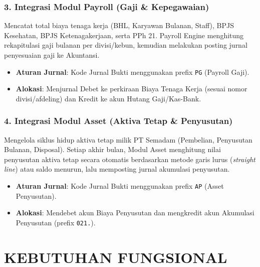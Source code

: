 \documentclass[11pt,a4paper]{article}
\begin{document}
\subsubsection{3. Integrasi Modul Payroll (Gaji \& Kepegawaian)}
Mencatat total biaya tenaga kerja (BHL, Karyawan Bulanan, Staff), BPJS Kesehatan, BPJS Ketenagakerjaan, serta PPh 21. Payroll Engine menghitung rekapitulasi gaji bulanan per divisi/kebun, kemudian melakukan posting jurnal penyesuaian gaji ke Akuntansi.
\begin{itemize}
    \item \textbf{Aturan Jurnal}: Kode Jurnal Bukti menggunakan prefix \texttt{PG} (Payroll Gaji).
    \item \textbf{Alokasi}: Menjurnal Debet ke perkiraan Biaya Tenaga Kerja (sesuai nomor divisi/afdeling) dan Kredit ke akun Hutang Gaji/Kas-Bank.
\end{itemize}

\subsubsection{4. Integrasi Modul Asset (Aktiva Tetap \& Penyusutan)}
Mengelola siklus hidup aktiva tetap milik PT Semadam (Pembelian, Penyusutan Bulanan, Disposal). Setiap akhir bulan, Modul Asset menghitung nilai penyusutan aktiva tetap secara otomatis berdasarkan metode garis lurus (\textit{straight line}) atau saldo menurun, lalu memposting jurnal akumulasi penyusutan.
\begin{itemize}
    \item \textbf{Aturan Jurnal}: Kode Jurnal Bukti menggunakan prefix \texttt{AP} (Asset Penyusutan).
    \item \textbf{Alokasi}: Mendebet akun Biaya Penyusutan dan mengkredit akun Akumulasi Penyusutan (prefix \texttt{021.}).
\end{itemize}

\newpage

\section{KEBUTUHAN FUNGSIONAL}
\end{document}
